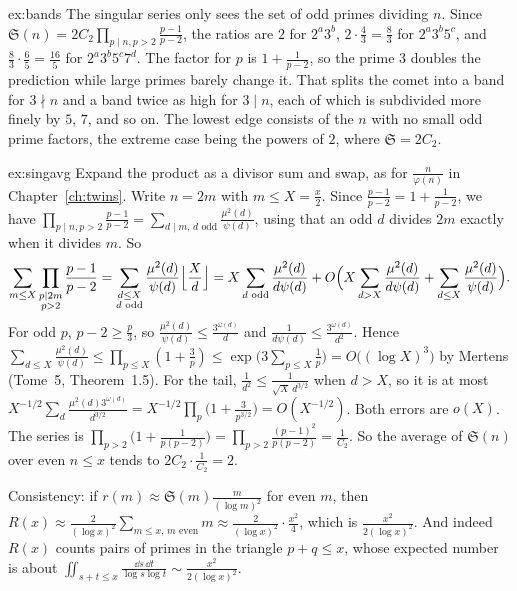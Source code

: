 \begin{solution}{ex:bands}
\idea The singular series only sees the set of odd primes dividing $n$.
\writeup Since $\mathfrak S(n)=2C_2\prod_{p\mid n,p>2}\frac{p-1}{p-2}$, the ratios are $2$ for $2^a3^b$, $2\cdot\frac43=\frac83$ for $2^a3^b5^c$, and
$\frac83\cdot\frac65=\frac{16}5$ for $2^a3^b5^c7^d$. The factor for $p$ is $1+\frac1{p-2}$, so the prime $3$ doubles the prediction while large primes barely
change it. That splits the comet into a band for $3\nmid n$ and a band twice as high for $3\mid n$, each of which is subdivided more finely by $5$, $7$,
and so on. The lowest edge consists of the $n$ with no small odd prime factors, the extreme case being the powers of $2$, where $\mathfrak S=2C_2$.
\end{solution}

\begin{solution}{ex:singavg}
\idea Expand the product as a divisor sum and swap, as for $\frac n{\varphi(n)}$ in Chapter~\ref{ch:twins}.
\writeup Write $n=2m$ with $m\le X=\frac x2$. Since $\frac{p-1}{p-2}=1+\frac1{p-2}$, we have $\prod_{p\mid n,p>2}\frac{p-1}{p-2}=\sum_{d\mid m,\,d\text{ odd}}\frac{\mu^2(d)}{\psi(d)}$,
using that an odd $d$ divides $2m$ exactly when it divides $m$. So
\[
\sum_{m\le X}\prod_{\substack{p\mid2m\\p>2}}\frac{p-1}{p-2}=\sum_{\substack{d\le X\\d\text{ odd}}}\frac{\mu^2(d)}{\psi(d)}\Bigl\lfloor\frac Xd\Bigr\rfloor=X\sum_{d\text{ odd}}\frac{\mu^2(d)}{d\psi(d)}+O\Bigl(X\sum_{d>X}\frac{\mu^2(d)}{d\psi(d)}+\sum_{d\le X}\frac{\mu^2(d)}{\psi(d)}\Bigr).
\]
For odd $p$, $p-2\ge\frac p3$, so $\frac{\mu^2(d)}{\psi(d)}\le\frac{3^{\omega(d)}}d$ and $\frac1{d\psi(d)}\le\frac{3^{\omega(d)}}{d^2}$. Hence
$\sum_{d\le X}\frac{\mu^2(d)}{\psi(d)}\le\prod_{p\le X}(1+\frac3p)\le\exp\bigl(3\sum_{p\le X}\frac1p\bigr)=O\bigl((\log X)^3\bigr)$ by Mertens (Tome~5,
Theorem~1.5). For the tail, $\frac1{d^2}\le\frac1{\sqrt X\,d^{3/2}}$ when $d>X$, so it is at most
$X^{-1/2}\sum_d\frac{\mu^2(d)3^{\omega(d)}}{d^{3/2}}=X^{-1/2}\prod_p\bigl(1+\frac3{p^{3/2}}\bigr)=O(X^{-1/2})$. Both errors are $o(X)$. The series is
$\prod_{p>2}\bigl(1+\frac1{p(p-2)}\bigr)=\prod_{p>2}\frac{(p-1)^2}{p(p-2)}=\frac1{C_2}$. So the average of $\mathfrak S(n)$ over even $n\le x$ tends to
$2C_2\cdot\frac1{C_2}=2$.

Consistency: if $r(m)\approx\mathfrak S(m)\frac m{(\log m)^2}$ for even $m$, then $R(x)\approx\frac2{(\log x)^2}\sum_{m\le x,\,m\text{ even}}m\approx\frac2{(\log x)^2}\cdot\frac{x^2}4$,
which is $\frac{x^2}{2(\log x)^2}$. And indeed $R(x)$ counts pairs of primes in the triangle $p+q\le x$, whose expected number is about
$\iint_{s+t\le x}\frac{\dd s\,\dd t}{\log s\log t}\sim\frac{x^2}{2(\log x)^2}$.
\end{solution}

